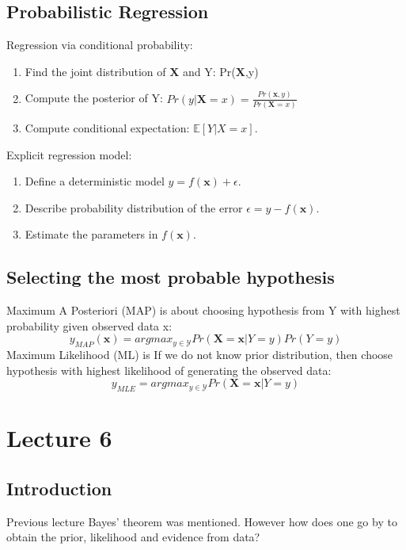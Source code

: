 \documentclass[12pt]{article}
\numberwithin{equation}{section}
\begin{document}
\subsection{Probabilistic Regression}
Regression via conditional probability:
\begin{enumerate}
\item Find the joint distribution of $\bm{X}$ and Y: Pr($\bm{X}$,y)
\item Compute the posterior of Y: $Pr(y| \bm{X} = x) = \frac{Pr(\bm{x},y)}{Pr(\bm{X} = x)}$
\item Compute conditional expectation: $\mathbb{E}[Y |X = x]$.
\end{enumerate}
Explicit regression model:
\begin{enumerate}
\item Define a deterministic model $y = f(\bm{x}) + \epsilon$.
\item Describe probability distribution of the error $\epsilon = y -  f(\bm{x}) $.
\item Estimate the parameters in $f(\bm{x})$.
\end{enumerate}

\subsection{Selecting the most probable hypothesis}
Maximum A Posteriori (MAP) is about choosing hypothesis from Y with highest probability given observed data x:
\begin{equation}
y_{MAP}(\bm{x}) = arg max_{y \in \mathcal{Y}}  Pr(\bm{X} = \bm{x} |Y = y)Pr(Y = y)
\end{equation}
Maximum Likelihood (ML) is If we do not know prior distribution, then choose hypothesis with highest likelihood of generating the observed data:
\begin{equation}
y_{MLE} = arg max_{y \in \mathcal{Y}} Pr(\bm{X} = \bm{x} |Y = y)
\end{equation}

\section{Lecture 6}

\subsection{Introduction}
Previous lecture Bayes' theorem was mentioned. However how does one go by to obtain the prior, likelihood and evidence from data?
\end{document}
